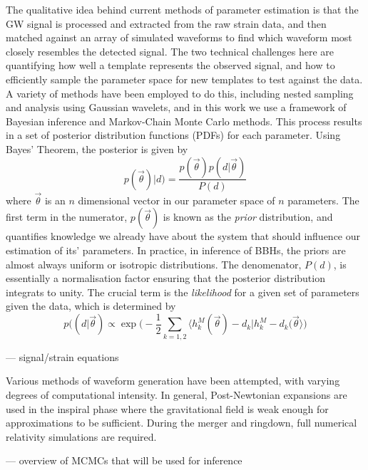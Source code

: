 \documentclass[]{article}
\begin{document}
The qualitative idea behind current methods of parameter estimation is that the GW signal is processed and extracted from the raw strain data, and then matched against an array of simulated waveforms to find which waveform most closely resembles the detected signal. The two technical challenges here are quantifying how well a template represents the observed signal, and how to efficiently sample the parameter space for new templates to test against the data. A variety of methods have been employed to do this, including nested sampling\cite{pe2} and analysis using Gaussian wavelets\cite{props}, and in this work we use a framework of Bayesian inference and Markov-Chain Monte Carlo methods\cite{inj}\cite{pe}. This process results in a set of posterior distribution functions (PDFs) for each parameter. Using Bayes' Theorem, the posterior is given by
\begin{equation}
p(\vec{\theta})|d)=\frac{p(\vec{\theta})p(d|\vec{\theta})}{P(d)}
\end{equation}
where $\vec{\theta}$ is an $n$ dimensional vector in our parameter space of $n$ parameters\cite{pe2}. The first term in the numerator, $p(\vec{\theta})$ is known as the \textit{prior} distribution, and quantifies knowledge we already have about the system that should influence our estimation of its' parameters. In practice, in inference of BBHs, the priors are almost always uniform or isotropic distributions. The denomenator, $P(d)$, is essentially a normalisation factor ensuring that the posterior distribution integrats to unity. The crucial term is the \textit{likelihood} for a given set of parameters given the data, which is determined by
\begin{equation}
p((d|\vec{\theta})\propto \exp\bigg(-\frac{1}{2}\sum_{k=1,2}\Big \langle h^M_k(\vec{\theta})-d_k \big\vert h^M_k-d_k(\vec{\theta} \Big \rangle\bigg)
\end{equation}

--- signal/strain equations

Various methods of waveform generation have been attempted, with varying degrees of computational intensity. In general, Post-Newtonian expansions are used in the inspiral phase where the gravitational field is weak enough for approximations to be sufficient. During the merger and ringdown, full numerical relativity simulations are required.

--- overview of MCMCs that will be used for inference
\end{document}
